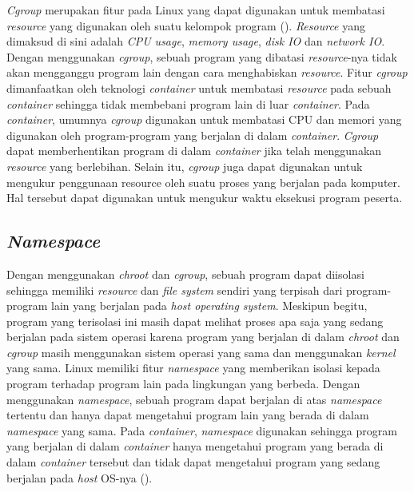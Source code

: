 \par \textit{Cgroup} merupakan fitur pada Linux yang dapat digunakan untuk membatasi \textit{resource} yang digunakan oleh suatu kelompok program (\cite{wfeltervmcontainer}). \textit{Resource} yang dimaksud di sini adalah \textit{CPU usage}, \textit{memory usage}, \textit{disk IO} dan \textit{network IO}. Dengan menggunakan \textit{cgroup}, sebuah program yang dibatasi \textit{resource}-nya tidak akan mengganggu program lain dengan cara menghabiskan \textit{resource}. Fitur \textit{cgroup} dimanfaatkan oleh teknologi \textit{container} untuk membatasi \textit{resource} pada sebuah \textit{container} sehingga tidak membebani program lain di luar \textit{container}. Pada \textit{container}, umumnya \textit{cgroup} digunakan untuk membatasi CPU dan memori yang digunakan oleh program-program yang berjalan di dalam \textit{container}. \textit{Cgroup} dapat memberhentikan program di dalam \textit{container} jika telah menggunakan \textit{resource} yang berlebihan. Selain itu, \textit{cgroup} juga dapat digunakan untuk mengukur penggunaan resource oleh suatu proses yang berjalan pada komputer. Hal tersebut dapat digunakan untuk mengukur waktu eksekusi program peserta.

\subsection{\textit{Namespace}}

\par Dengan menggunakan \textit{chroot} dan \textit{cgroup}, sebuah program dapat diisolasi sehingga memiliki \textit{resource} dan \textit{file system} sendiri yang terpisah dari program-program lain yang berjalan pada \textit{host operating system}. Meskipun begitu, program yang terisolasi ini masih dapat melihat proses apa saja yang sedang berjalan pada sistem operasi karena program yang berjalan di dalam \textit{chroot} dan \textit{cgroup} masih menggunakan sistem operasi yang sama dan menggunakan \textit{kernel} yang sama. Linux memiliki fitur \textit{namespace} yang memberikan isolasi kepada program terhadap program lain pada lingkungan yang berbeda. Dengan menggunakan \textit{namespace}, sebuah program dapat berjalan di atas \textit{namespace} tertentu dan hanya dapat mengetahui program lain yang berada di dalam \textit{namespace} yang sama. Pada \textit{container}, \textit{namespace} digunakan sehingga program yang berjalan di dalam \textit{container} hanya mengetahui program yang berada di dalam \textit{container} tersebut dan tidak dapat mengetahui program yang sedang berjalan pada \textit{host} OS-nya (\cite{wfeltervmcontainer}).

